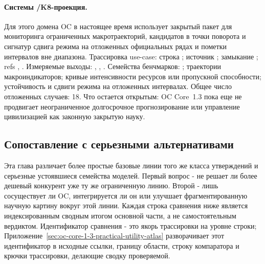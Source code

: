 \paragraph{Системы /\allowbreak K8-проекция.}
Для этого домена OC в настоящее время использует закрытый пакет для мониторинга ограниченных макротраекторий, кандидатов в точки поворота и сигнатур сдвига режима на отложенных официальных рядах и пометки интервалов вне диапазона.
Трассировка use-case: строка ; \allowbreak источник ; \allowbreak замыкание ; \allowbreak refs , \allowbreak {}.
Измеряемые выходы: , , .
Семейства бенчмарков: ; траектории макроиндикаторов; кривые интенсивности ресурсов или пропускной способности; устойчивость и сдвиги режима на отложенных интервалах.
Общее число отложенных случаев: 18.
Что остается открытым: OC Core~1.3 пока еще не продвигает неограниченное долгосрочное прогнозирование или управление цивилизацией как законную закрытую науку.

\subsection{Сопоставление с серьезными альтернативами}
Эта глава различает более простые базовые линии того же класса утверждений и серьезные устоявшиеся семейства моделей. Первый вопрос - не решает ли более дешевый конкурент уже ту же ограниченную линию. Второй - лишь сосуществует ли OC, интегрируется ли он или улучшает фрагментированную научную картину вокруг этой линии.
Каждая строка сравнения ниже является индексированным сводным итогом основной части, а не самостоятельным вердиктом. Идентификатор сравнения - это якорь трассировки на уровне строки; Приложение~\ref{sec:oc-core-1-3-practical-utility-atlas} разворачивает этот идентификатор в исходные ссылки, границу области, строку компаратора и крючки трассировки, делающие сводку проверяемой.

